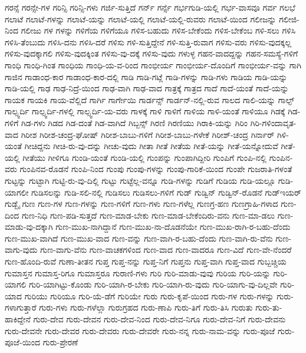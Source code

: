 {ಗರನ್ಸೆ
ಗರನ್ಸೇ-ಗಳ
ಗರಿನ್ಸಿ
ಗರಿನ್ಸಿ-ಗಳು
ಗರ್ಜಿ-ಸುತ್ತಿದೆ
ಗರ್ನ್
ಗರ್ನ್ಸೆ
ಗರ್ಭಗುಡಿ-ಯಲ್ಲಿ
ಗರ್ಭ-ವಾಸವೂ
ಗರ್ವ
ಗಲಭೆ
ಗಲಾಟೆ
ಗಲಾಟೆ-ಗಳನ್ನು
ಗಲಾಟೆ-ಯನ್ನು
ಗಲಾಟೆ-ಯಲ್ಲಿ
ಗಲಾಟೆ-ಯಲ್ಲಿ-ರುವರು
ಗಲಾಟೆ-ಯಿಂದ
ಗಲೀಜನ್ನು
ಗಲೀಜಿ-ನಿಂದ
ಗಲೀಜು
ಗಳ
ಗಳನ್ನು
ಗಳಿಗೆಯ
ಗಳಿಗೆಯೂ
ಗಳಿಸ-ಬಹುದು
ಗಳಿಸ-ಬೇಕೆಂದು
ಗಳಿಸ-ಬೇಕೆಂಬ
ಗಳಿ-ಸಲು
ಗಳಿಸಿ
ಗಳಿಸಿ-ತೆಂಬುದು
ಗಳಿಸಿ-ದನು
ಗಳಿಸಿ-ದರೆ
ಗಳಿಸು
ಗಳಿ-ಸುತ್ತಿದ್ದೇನೆ
ಗಳಿ-ಸುತ್ತಿ-ರುವಾಗ
ಗಳಿಸು-ವರು
ಗಳಿಸು-ವುದಕ್ಕಲ್ಲ
ಗಳಿಸು-ವುದಕ್ಕಾಗಲಿ
ಗಳಿಸು-ವುದಕ್ಕಿಂತ
ಗಳಿಸು-ವು-ದಕ್ಕೆ
ಗಳಿಸು-ವುದು
ಗಳುಳ್ಳ
ಗಹನ-ವಾದದ್ದನ್ನು
ಗಹನ-ಸಮಸ್ಯೆ-ಗಳಿಗೆ
ಗಾಂಧಿ
ಗಾಂಧಿ-ಗಿಂತ
ಗಾಂಧಿಯ
ಗಾಂಧಿ-ಯ-ವ-ರಿಂದ
ಗಾಂಭೀರ್ಯ
ಗಾಂಭೀರ್ಯ-ದೊಂದಿಗೆ
ಗಾಂಭೀರ್ಯ-ವನ್ನು
ಗಾಗಿ
ಗಾಜಿನ
ಗಾಡಾಂಧ-ಕಾರ
ಗಾಡಾಂಧ-ಕಾರ-ದಲ್ಲಿ
ಗಾಡಿ
ಗಾಡಿ-ಗಟ್ಲೆ
ಗಾಡಿ-ಗಳನ್ನು
ಗಾಡಿ-ಗಳು
ಗಾಡಿಯ
ಗಾಡಿ-ಯನ್ನು
ಗಾಡಿ-ಯಲ್ಲಿ
ಗಾಢ
ಗಾಢ-ನಿದ್ರೆ-ಯಿಂದ
ಗಾಢ-ವಾಗಿ
ಗಾಢ-ವಾದ
ಗಾತ್ರಕ್ಕೆ
ಗಾತ್ರದ
ಗಾದೆ
ಗಾದೆ-ಯಂತೆ
ಗಾದೆ-ಯನ್ನು
ಗಾಯಕ
ಗಾಯಕಿ
ಗಾಯ-ವೆಲ್ಲಿದೆ
ಗಾರ್ಗಿ
ಗಾರ್ಗೇಯಿ
ಗಾರ್ಡನ್ಸ್
ಗಾರ್ಡನ್-ನಲ್ಲಿ-ರುವ
ಗಾಲದ
ಗಾಲಿ-ಯನ್ನು
ಗಾಲ್ಫ್
ಗಾಲ್ಸ್ವರ್ದಿ
ಗಾಲ್ಸ್ವರ್ದಿ-ಗಳಲ್ಲಿ
ಗಾಲ್ಸ್ವರ್ದಿ-ಯ-ವರು
ಗಾಳಕ್ಕೆ
ಗಾಳಿ
ಗಾಳಿಗೆ
ಗಾಳಿಯ
ಗಾಳಿ-ಯಂತೆ
ಗಾಳಿಯೂ
ಗಿಡಕ್ಕೆ
ಗಿಡ-ಗಳಿಗೆ
ಗಿಡ-ಗಳು
ಗಿಡದ
ಗಿಡ-ದಂತೆ
ಗಿಡ-ವಾಗಿದೆ
ಗಿಬ್ಬನ್ಸ್
ಗಿರಣಿ
ಗಿರಣಿಯು
ಗಿರಾಕಿ-ಯನ್ನು
ಗಿರಿಂ
ಗಿರಿ-ಗಳಿಂದಾವೃತ-ವಾದ
ಗಿರೀಶ
ಗಿರೀಶ-ಚಂದ್ರ-ಘೋಷ್
ಗಿರೀಶ-ಬಾಬು-ಗಳಿಗೆ
ಗಿರೀಶ-ಬಾಬು-ಗಳೇಕೆ
ಗಿರೀಶ್-ಚಂದ್ರ
ಗಿರ್ನಾರ್
ಗಿಳಿ-ಯಂತೆ
ಗೀಚಿದ್ದನು
ಗೀಚಿ-ರು-ವು-ದನ್ನು
ಗೀಚು-ವುದು
ಗೀತಾ
ಗೀತೆ
ಗೀತೆಯ
ಗೀತೆ-ಯನ್ನು
ಗೀತೆ-ಯನ್ನೋದುವೆ
ಗೀತೆ-ಯಲ್ಲಿ
ಗೀತೆಯು
ಗೀಳಿಗೂ
ಗುಂಡಿ-ಯಂತೆ
ಗುಂಡಿ-ಯಲ್ಲಿ
ಗುಂಪನ್ನು
ಗುಂಪಾಗಿದ್ದೀರಿ
ಗುಂಪಿಗೆ
ಗುಂಪಿ-ನಲ್ಲಿ
ಗುಂಪಿನ-ವರು
ಗುಂಪಿನವ-ರೊಡನೆ
ಗುಂಪಿ-ನಿಂದ
ಗುಂಪು
ಗುಂಪು-ಗಳನ್ನು
ಗುಂಪು-ಗಾರಿಕೆ-ಯಿಂದ
ಗುಂಪೇ
ಗುಜರಾತಿ-ಗಳಂತೆ
ಗುಟ್ಟನ್ನು
ಗುಟ್ಟಾಗಿ
ಗುಟ್ಟಿ-ರು-ವು-ದಿಲ್ಲಿ
ಗುಟ್ಟು
ಗುಟ್ಟೆಲ್ಲ-ವನ್ನೂ
ಗುಡಿ-ಗಳನ್ನು
ಗುಡಿಗೆ
ಗುಡಿಯ
ಗುಡಿ-ಯಲ್ಲೂ
ಗುಡಿ-ಯಾಗಲೀ
ಗುಡಿಸಲನ್ನು
ಗುಡಿ-ಸಲಿ-ನಲ್ಲಿ
ಗುಡಿಸಲು
ಗುಡಿಸಲು-ಗಳಿಗೆ
ಗುಡ್
ಗುಡ್ವಿನ್
ಗುಡ್ವಿನ್-ರೊಡನೆ
ಗುಡ್ಇಯರ್
ಗುಡ್ಬೈ
ಗುಣ
ಗುಣ-ಗಳ
ಗುಣ-ಗಳನ್ನು
ಗುಣ-ಗಳಿಗೆ
ಗುಣ-ಗಳು
ಗುಣ-ಗಳೆಲ್ಲ
ಗುಣಗ್ರ-ಹಣ
ಗುಣಗ್ರಾಹಿ-ಗಳಾದ
ಗುಣ-ದಿಂದ
ಗುಣ-ನಿಧಿ
ಗುಣ-ಪಡಿ-ಸುತ್ತದೆ
ಗುಣ-ಮಾಡ-ಬೇಕು
ಗುಣ-ಮಾಡ-ಬೇಕೆಂದಿರು-ವನು
ಗುಣ-ಮಾ-ಡಲು
ಗುಣ-ಮಾಡು-ವು-ದಕ್ಕಾಗಿ
ಗುಣ-ಮುಖ-ನಾಗಿದ್ದಾನೆ
ಗುಣ-ಮುಖ-ನಾ-ದೊಡನೆಯೇ
ಗುಣ-ಮುಖ-ರಾಗಿ-ರ-ಬಹು-ದೆಂದು
ಗುಣ-ಮುಖ-ವಾಗಿದೆ
ಗುಣ-ಮುಖ-ವಾದ
ಗುಣ-ವನ್ನು
ಗುಣ-ವಾಗಿ-ರ-ಬಹು-ದೆಂದು
ಗುಣ-ವಾಗಿ-ರು-ವೆನು
ಗುಣ-ವಾಗು-ವುದು
ಗುಣ-ವಾಗು-ವೆನು
ಗುಣ-ವಾಚಕಗಳಿಂದ
ಗುಣ-ವಾದ
ಗುಣ-ವಾದರೂ
ಗುಣ-ವಿದೆ
ಗುಣ-ವೇ-ನೆಂದರೆ
ಗುಣ-ಹೊಂದಿ-ರುವೆ
ಗುಣಾ-ತೀತನ
ಗುಪ್ತ
ಗುಪ್ತ-ನನ್ನು
ಗುಪ್ತ-ನಿಗೆ
ಗುಪ್ತನು
ಗುಪ್ತ-ವಾಗಿ
ಗುಪ್ತ-ವಾದ
ಗುಬ್ಬಚ್ಚಿಯ
ಗುಮಾಸ್ತನ
ಗುಮಾಸ್ತ-ರಿಗೂ
ಗುಮಾಸ್ತರೂ
ಗುರಾಣಿ-ಗಳು
ಗುರಿ
ಗುರಿ-ಮಾಡು-ವುವು
ಗುರಿಯ
ಗುರಿ-ಯನ್ನು
ಗುರಿ-ಯಾಗಲಿ
ಗುರಿ-ಯಾಗಿಟ್ಟು-ಕೊಂಡು
ಗುರಿ-ಯಾಗಿ-ರ-ಬೇಕು
ಗುರಿ-ಯಾಗಿ-ರು-ವುದು
ಗುರಿ-ಯಾಗು-ವು-ದಿಲ್ಲವೇ
ಗುರಿ-ಯಾದ
ಗುರಿಯು
ಗುರಿಯೂ
ಗುರಿ-ಯೆ-ಡೆಗೆ
ಗುರಿಯೇ
ಗುರು
ಗುರು-ಕೃಪೆ-ಯಿಂದ
ಗುರು-ಗಳ
ಗುರು-ಗಳನ್ನು
ಗುರು-ಗಳಾಗುತ್ತಾರೆ
ಗುರು-ಗಳು
ಗುರು-ಗಳೆಲ್ಲಾ
ಗುರುಗ್ರಹದ
ಗುರು-ಣಾಪಿ
ಗುರು-ತಿಗೆ
ಗುರು-ತಿಸಿ
ಗುರುತು
ಗುರು-ತು-ಹಾಕಿದ್ದೇನೆ
ಗುರು-ದೇವ
ಗುರು-ದೇವನ
ಗುರು-ದೇವ-ನಿಂದ
ಗುರು-ದೇವ-ನಿಗೂ
ಗುರು-ದೇವ-ನಿಗೆ
ಗುರು-ದೇವನು
ಗುರು-ದೇವನೇ
ಗುರು-ದೇವರ
ಗುರು-ದೇವರು
ಗುರು-ದೇವರೇ
ಗುರು-ನನ್ನ
ಗುರು-ನಾಮ-ವನ್ನು
ಗುರು-ಪೂಜೆ
ಗುರು-ಪೂಜೆ-ಯಿಂದ
ಗುರು-ಪ್ರೇರಣೆ
}
